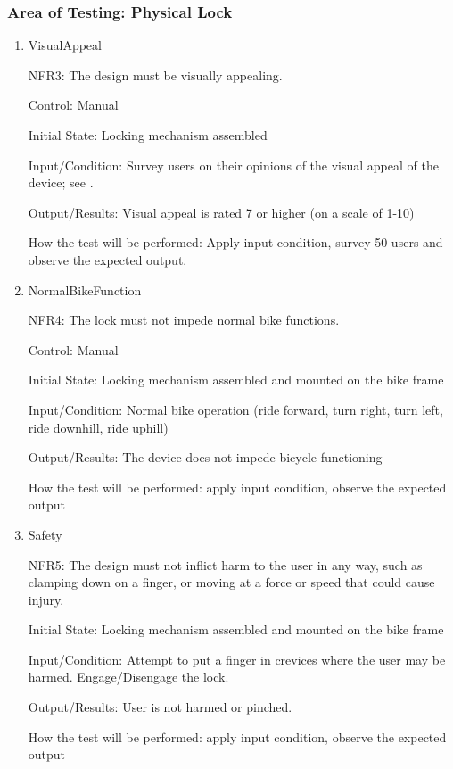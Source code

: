 \documentclass[12pt, titlepage]{article}
\begin{document}
\subsubsection{Area of Testing: Physical Lock}
\begin{enumerate}

\item{VisualAppeal

NFR3: The design must be visually appealing. }

Control: Manual 

Initial State: Locking mechanism assembled 

Input/Condition: Survey users on their opinions of the visual appeal of the device; see .

Output/Results: Visual appeal is rated 7 or higher (on a scale of 1-10) 

How the test will be performed: Apply input condition, survey 50 users and observe the expected output.

\item{NormalBikeFunction

NFR4: The lock must not impede normal bike functions. }

Control: Manual 

Initial State: Locking mechanism assembled and mounted on the bike frame 

Input/Condition: Normal bike operation (ride forward, turn right, turn left, ride downhill, ride uphill) 

Output/Results: The device does not impede bicycle functioning 

How the test will be performed: apply input condition, observe the expected output

\item{Safety

NFR5: The design must not inflict harm to the user in any way, such as clamping down on a finger, or moving at a force or speed that could cause injury. }

Initial State: Locking mechanism assembled and mounted on the bike frame 

Input/Condition: Attempt to put a finger in crevices where the user may be harmed. Engage/Disengage the lock.

Output/Results: User is not harmed or pinched. 

How the test will be performed: apply input condition, observe the expected output


\end{enumerate}
\end{document}
